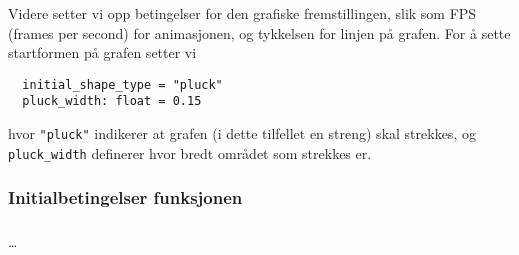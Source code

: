 Videre setter vi opp betingelser for den grafiske fremstillingen, slik som FPS (frames per second) for animasjonen, og
tykkelsen for linjen på grafen. For å sette startformen på grafen setter vi 

\begin{verbatim}
  initial_shape_type = "pluck"
  pluck_width: float = 0.15
\end{verbatim}

hvor \verb|"pluck"| indikerer at grafen (i dette tilfellet en streng) skal strekkes, og \verb|pluck_width| definerer hvor bredt området som strekkes er.

\subsubsection{Initialbetingelser funksjonen}


\subsubsection{}
\dots
